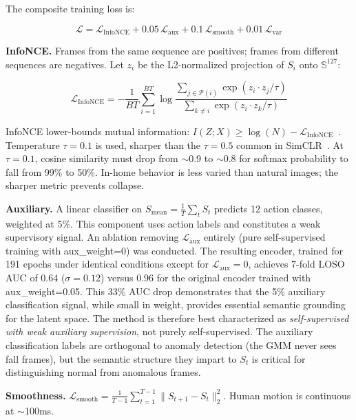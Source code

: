 \documentclass[11pt,a4paper]{article}
\begin{document}
The composite training loss is:

\begin{equation}
\mathcal{L} = \mathcal{L}_{\text{InfoNCE}} + 0.05\,\mathcal{L}_{\text{aux}} + 0.1\,\mathcal{L}_{\text{smooth}} + 0.01\,\mathcal{L}_{\text{var}}
\end{equation}

\textbf{InfoNCE.}
Frames from the same sequence are positives; frames from different sequences are negatives.
Let $z_i$ be the L2-normalized projection of $S_i$ onto $\mathbb{S}^{127}$:

\begin{equation}
\mathcal{L}_{\text{InfoNCE}} = -\frac{1}{BT}\sum_{i=1}^{BT} \log \frac{\sum_{j \in \mathcal{P}(i)} \exp(z_i \cdot z_j / \tau)}{\sum_{k \neq i} \exp(z_i \cdot z_k / \tau)}
\end{equation}

InfoNCE lower-bounds mutual information: $I(Z; X) \geq \log(N) - \mathcal{L}_{\text{InfoNCE}}$~\cite{oord2018representation}.
Temperature $\tau{=}0.1$ is used, sharper than the $\tau{=}0.5$ common in SimCLR~\cite{chen2020simclr}.
At $\tau{=}0.1$, cosine similarity must drop from $\sim$0.9 to $\sim$0.8 for softmax probability to fall from 99\% to 50\%.
In-home behavior is less varied than natural images; the sharper metric prevents collapse.

\textbf{Auxiliary.}
A linear classifier on $S_{\text{mean}} = \frac{1}{T}\sum_t S_t$ predicts 12 action classes, weighted at 5\%.
This component uses action labels and constitutes a weak supervisory signal.
An ablation removing $\mathcal{L}_{\text{aux}}$ entirely (pure self-supervised training with aux\_weight=0) was conducted.
The resulting encoder, trained for 191 epochs under identical conditions except for $\mathcal{L}_{\text{aux}}=0$, achieves 7-fold LOSO AUC of 0.64 ($\sigma=0.12$) versus 0.96 for the original encoder trained with aux\_weight=0.05.
This 33\% AUC drop demonstrates that the 5\% auxiliary classification signal, while small in weight, provides essential semantic grounding for the latent space.
The method is therefore best characterized as \emph{self-supervised with weak auxiliary supervision}, not purely self-supervised.
The auxiliary classification labels are orthogonal to anomaly detection (the GMM never sees fall frames), but the semantic structure they impart to $S_t$ is critical for distinguishing normal from anomalous frames.

\textbf{Smoothness.}
$\mathcal{L}_{\text{smooth}} = \frac{1}{T-1}\sum_{t=1}^{T-1} \|S_{t+1} - S_t\|_2^2$. Human motion is continuous at $\sim$100ms.
\end{document}
